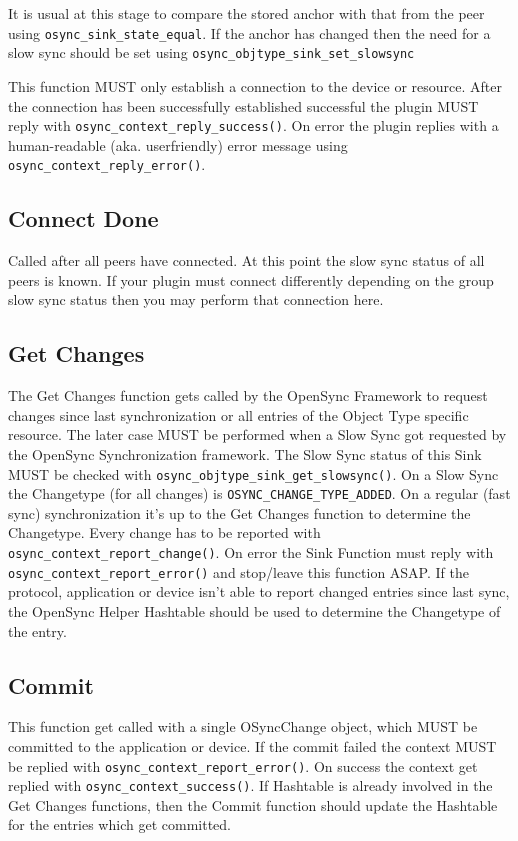 It is usual at this stage to compare the stored anchor with that from the peer
using \verb|osync_sink_state_equal|.  If the anchor has changed then the need for
a slow sync should be set using \verb|osync_objtype_sink_set_slowsync|

This function MUST only establish a connection to the device or resource. After
the connection has been successfully established successful the plugin MUST
reply with \verb|osync_context_reply_success()|. On error the plugin replies
with a human-readable (aka. userfriendly) error message using
\verb|osync_context_reply_error()|.
\subsection{Connect Done}
Called after all peers have connected.  At this point the slow sync status of
all peers is known.  If your plugin must connect differently depending on the
group slow sync status then you may perform that connection here.
\subsection{Get Changes}
The Get Changes function gets called by the OpenSync Framework to request changes
since last synchronization or all entries of the Object Type specific resource.
The later case MUST be performed when a Slow Sync got requested by the OpenSync
Synchronization framework. The Slow Sync status of this Sink MUST be
checked with \verb|osync_objtype_sink_get_slowsync()|. On a Slow Sync the 
Changetype (for all changes) is \verb|OSYNC_CHANGE_TYPE_ADDED|. On a regular 
(fast sync) synchronization it's up to the Get Changes function to determine 
the Changetype. Every change has to be reported with 
\verb|osync_context_report_change()|. On error the Sink Function must
reply with \verb|osync_context_report_error()| and stop/leave this 
function ASAP. If the protocol, application or device isn't able to report 
changed entries since last sync, the OpenSync Helper Hashtable should be used 
to determine the Changetype of the entry.
\subsection{Commit}
This function get called with a single OSyncChange object, which MUST be
committed to the application or device. If the commit failed the context MUST be
replied with \verb|osync_context_report_error()|. On success the context get
replied with \verb|osync_context_success()|. If Hashtable is already involved in
the Get Changes functions, then the Commit function should update the Hashtable
for the entries which get committed.
